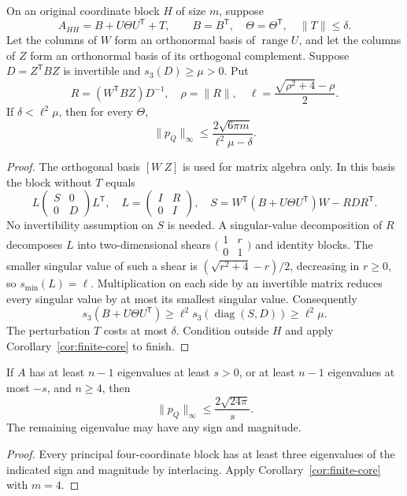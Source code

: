 \begin{theorem}
\label{supp:schur-protection}
On an original coordinate block $H$ of size $m$, suppose
\[
 A_{HH}=B+U\Theta U^{\mathsf T}+T,
 \qquad B=B^{\mathsf T},\quad\Theta=\Theta^{\mathsf T},
 \quad\|T\|\le\delta.
\]
Let the columns of $W$ form an orthonormal basis of
$\operatorname{range}U$, and let the columns of $Z$ form an
orthonormal basis of its orthogonal complement.
Suppose $D=Z^{\mathsf T}BZ$ is invertible and $s_3(D)\ge\mu>0$.
Put
\[
 R=(W^{\mathsf T}BZ)D^{-1},\quad\rho=\|R\|,\quad
 \ell=\frac{\sqrt{\rho^2+4}-\rho}{2}.
\]
If $\delta<\ell^2\mu$, then for every $\Theta$,
\[
 \|p_Q\|_\infty\le
 \frac{2\sqrt{6\pi m}}{\ell^2\mu-\delta}.
\]
\end{theorem}
\begin{proof}
The orthogonal basis $[W\ Z]$ is used for matrix algebra only.
In this basis the block without $T$ equals
\[
 L\begin{pmatrix}S&0\\0&D\end{pmatrix}L^{\mathsf T},
 \quad L=\begin{pmatrix}I&R\\0&I\end{pmatrix},
 \quad
 S=W^{\mathsf T}(B+U\Theta U^{\mathsf T})W-RDR^{\mathsf T}.
\]
No invertibility assumption on $S$ is needed.  A singular-value
decomposition of $R$ decomposes $L$ into two-dimensional shears
$\bigl(\begin{smallmatrix}1&r\\0&1\end{smallmatrix}\bigr)$
and identity blocks.  The smaller singular value of such a shear
is $(\sqrt{r^2+4}-r)/2$, decreasing in $r\ge0$, so
$s_{\min}(L)=\ell$.  Multiplication on each side by an invertible
matrix reduces every singular value by at most its smallest singular
value.  Consequently
\[
 s_3(B+U\Theta U^{\mathsf T})
 \ge\ell^2s_3(\operatorname{diag}(S,D))\ge\ell^2\mu.
\]
The perturbation $T$ costs at most $\delta$.  Condition outside $H$
and apply Corollary~\ref{cor:finite-core} to finish.
\end{proof}

\begin{corollary}
\label{supp:codimension-one}
If $A$ has at least $n-1$ eigenvalues at least $s>0$, or at least
$n-1$ eigenvalues at most $-s$, and $n\ge4$, then
\[
 \|p_Q\|_\infty\le\frac{2\sqrt{24\pi}}s.
\]
The remaining eigenvalue may have any sign and magnitude.
\end{corollary}
\begin{proof}
Every principal four-coordinate block has at least three eigenvalues
of the indicated sign and magnitude by interlacing.  Apply
Corollary~\ref{cor:finite-core} with $m=4$.
\end{proof}

